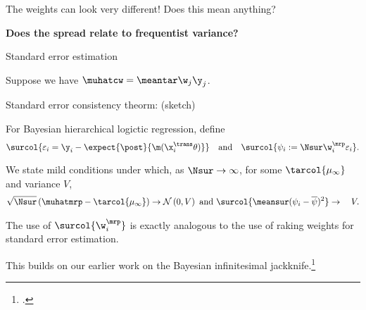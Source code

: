 




\begin{frame}[c]{The weights can look very different!}
\centering
{
Does this mean anything?  \\
}

{
\textbf{Does the spread relate to frequentist variance?}
}

\splitpagenoline{
    \AlexanderWeightPlot{}
}{
    \LaxWeightPlot{}
}
\end{frame}




\begin{frame}[c]{Standard error estimation}


Suppose we have $\muhatcw = \meantar \w_j \y_j$.


\begin{block}{Standard error consistency theorm: (sketch)}

For Bayesian hierarchical logictic regression, define
$$
\surcol{\varepsilon_i = \y_i - \expect{\post}{\m(\x_i^\trans \theta)}}
\quad\textrm{and}\quad
\surcol{\psi_i := \Nsur \w_i^\mrp \varepsilon_i}.
$$

We state mild conditions under which, as $\Nsur \rightarrow \infty$,
for some $\tarcol{\mu_\infty}$ and variance $V$,
$$
\begin{aligned}
    \sqrt{\Nsur}\left(\muhatmrp - \tarcol{\mu_\infty} \right) \rightarrow{}&
    \mathcal{N}\left(0, V\right)
    \textrm{ and }
\surcol{\meansur (\psi_i - \overline{\psi})^2} \rightarrow{}& V.
\end{aligned}
$$
\end{block}

The use of $\surcol{\w_i^\mrp}$ is exactly analogous to the use of raking weights
for standard error estimation.

This builds on our earlier work on the Bayesian
infinitesimal jackknife.\footcite{giordano:2024:bayesij}

\end{frame}

